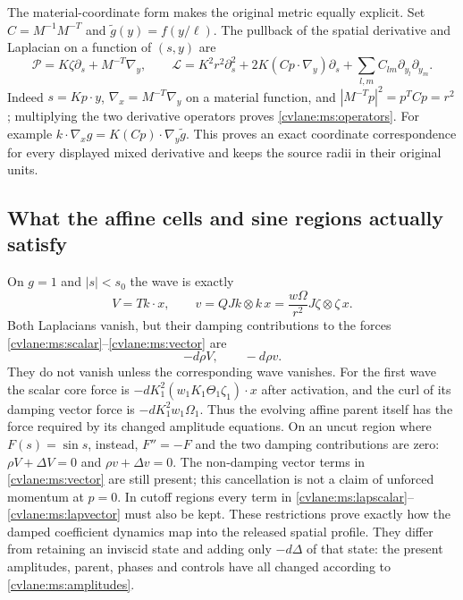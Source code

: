 The material-coordinate form makes the original metric equally
explicit. Set $C=M^{-1}M^{-T}$ and $\widetilde g(y)=f(y/\ell)$.
The pullback of the spatial derivative and Laplacian on a function
of $(s,y)$ are
\begin{equation}\label{cvlane:ms:operators}
 \mathcal P=K\zeta\partial_s+M^{-T}\nabla_y,
 \qquad\mathcal L=K^2r^2\partial_s^2
             +2K(Cp\cdot\nabla_y)\partial_s+
                       \sum_{l,m}C_{lm}\partial_{y_l}\partial_{y_m}.
\end{equation}
Indeed $s=Kp\cdot y$, $\nabla_x=M^{-T}\nabla_y$ on a
material function, and $|M^{-T}p|^2=p^TCp=r^2$; multiplying
the two derivative operators proves \eqref{cvlane:ms:operators}.
For example $k\cdot\nabla_xg=K(Cp)\cdot\nabla_y\widetilde g$.
This proves an exact coordinate correspondence for every displayed
mixed derivative and keeps the source radii in their original units.

\subsection{What the affine cells and sine regions actually satisfy}

On $g=1$ and $|s|<s_0$ the wave is exactly
\[
 V=T k\cdot x,\qquad
 v=QJk\otimes k\,x
   =\frac{w\Omega}{r^2}J\zeta\otimes\zeta\,x.
\]
Both Laplacians vanish, but their damping contributions to the
forces \eqref{cvlane:ms:scalar}--\eqref{cvlane:ms:vector} are
\begin{equation}\label{cvlane:ms:coreforces}
 -d\rho V,\qquad -d\rho v.
\end{equation}
They do not vanish unless the corresponding wave vanishes.
For the first wave the scalar core force is
$-dK_1^2(w_1K_1\Theta_1\zeta_1)\cdot x$ after activation,
and the curl of its damping vector force is
$-dK_1^2w_1\Omega_1$. Thus the evolving affine parent itself
has the force required by its changed amplitude equations.
On an uncut region where $F(s)=\sin s$, instead,
$F''=-F$ and the two damping contributions are zero:
$\rho V+\Delta V=0$ and $\rho v+\Delta v=0$.
The non-damping vector terms in \eqref{cvlane:ms:vector} are still
present; this cancellation is not a claim of unforced momentum
at $p=0$. In cutoff regions every term in
\eqref{cvlane:ms:lapscalar}--\eqref{cvlane:ms:lapvector} must also be kept.
These restrictions prove exactly how the damped coefficient
dynamics map into the released spatial profile. They differ
from retaining an inviscid state and adding only $-d\Delta$ of
that state: the present amplitudes, parent, phases and controls
have all changed according to \eqref{cvlane:ms:amplitudes}.

